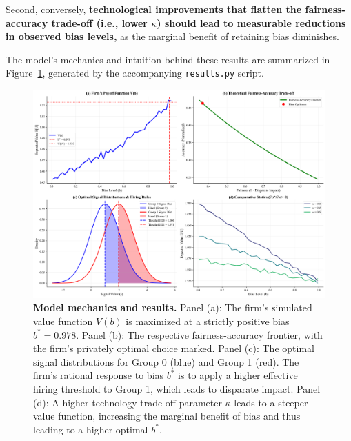 Second, conversely, \textbf{technological improvements that flatten the fairness-accuracy trade-off (i.e., lower $\kappa$) should lead to measurable reductions in observed bias levels,} as the marginal benefit of retaining bias diminishes.

The model's mechanics and intuition behind these results are summarized in Figure~\ref{fig:main_results}, generated by the accompanying \texttt{results.py} script.

\begin{figure}[H]
    \centering
    \includegraphics[width=\textwidth]{../figures/figure_1_model_mechanics.png}
    \caption{\textbf{Model mechanics and results.} 
    Panel (a): The firm's simulated value function $V(b)$ is maximized at a strictly positive bias $b^*=0.978$. 
    Panel (b): The respective fairness-accuracy frontier, with the firm's privately optimal choice marked. 
    Panel (c): The optimal signal distributions for Group 0 (blue) and Group 1 (red). The firm's rational response to bias $b^*$ is to apply a higher effective hiring threshold to Group 1, which leads to disparate impact.
    Panel (d): A higher technology trade-off parameter $\kappa$ leads to a steeper value function, increasing the marginal benefit of bias and thus leading to a higher optimal $b^*$.}
    \label{fig:main_results}
\end{figure}

